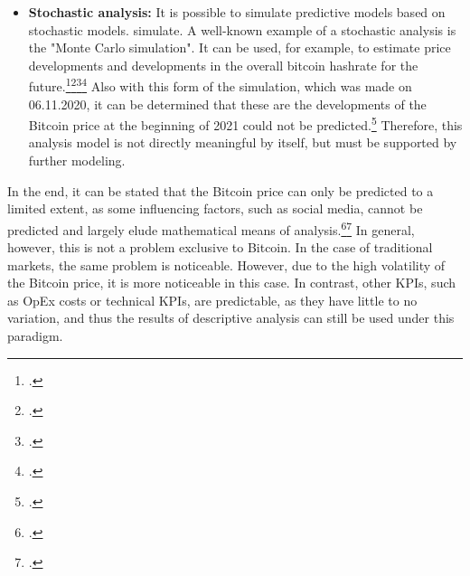 \begin{itemize}
\begin{itemize}
        can be relevant for the sub-hypotheses to be tested. One application of
        regression analysis is the prediction of the value of bitcoins.\footcite[Cf.][p. 19]{ibrahim2020bitcoin} In principle
        a prediction using these mechanisms is quite possible. At the end of 2020, factors such as social media have been added,
        which make this form of analysis much more difficult.\footcite[Cf.][]{forbes2021musk} Accordingly, regression analysis can be a
        methodology to predict rates, but must be extended to include other analytical models to get a good
        overall picture. 
        \item \textbf{Stochastic analysis: }It is possible to simulate predictive models based on stochastic models.
        simulate. A well-known example of a stochastic analysis is the "Monte Carlo simulation". It can
        be used, for example, to estimate price developments and developments in the overall bitcoin hashrate for the future.\footcite[Cf.][p. 28]{cocco2016modeling}\footcite[Cf.][]{appendix:mcszenarien}\footcite[Cf.][]{appendix:mcpreis}\footcite[Cf.][]{appendix:mchashrate}
        Also with this form of the simulation, which was made on 06.11.2020, it can be determined that these are the developments
        of the Bitcoin price at the beginning of 2021 could not be predicted.\footcite[Cf.][]{appendix:btcusd} Therefore, this analysis model is not directly meaningful by itself,
        but must be supported by further modeling.
    \end{itemize}

    In the end, it can be stated that the Bitcoin price can only be predicted to a limited extent, as some influencing factors, such as
    social media, cannot be predicted and largely elude mathematical means of analysis.\footcite[Cf.][]{forbes2021musk}\footcite[Cf.][p. 325]{badertscher2017bitcoin}
    In general, however, this is not a problem exclusive to Bitcoin. In the case of traditional markets, the same
    problem is noticeable. However, due to the high volatility of the Bitcoin price, it is more noticeable in this case.
    In contrast, other \acp{KPI}, such as \ac{OpEx} costs or technical \acp{KPI}, are predictable, as they have
    little to no variation, and thus the results of descriptive analysis can still be used under this paradigm.


\end{itemize}

